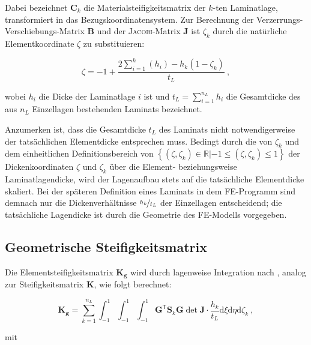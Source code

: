 \documentclass[11pt,titlepage,listof=totoc,bibliography=totoc,twoside]{scrreprt}
\begin{document}
Dabei bezeichnet $\mathbf{C}_k$ die Materialsteifigkeitsmatrix der $k$-ten Laminatlage, transformiert in das Bezugskoordinatensystem. Zur Berechnung der Verzerrungs-Verschiebungs-Matrix $\mathbf{B}$ und der \textsc{Jacobi}-Matrix $\mathbf{J}$ ist $\zeta_k$ durch die natürliche Elementkoordinate $\zeta$ zu substituieren:

\begin{equation}
\label{eq:zeta_k}
 \zeta = -1 + \frac{2 \sum_{i=1}^k \left(h_i \right) - h_k \left(1 - \zeta_k \right)}{t_L} \ ,
\end{equation}

wobei $h_i$ die Dicke der Laminatlage $i$ ist und $t_L = \sum_{i=1}^{n_L} h_i$ die Gesamtdicke des aus $n_L$ Einzellagen bestehenden Laminats bezeichnet.\par
Anzumerken ist, dass die Gesamtdicke $t_L$ des Laminats nicht notwendigerweise der tatsächlichen Elementdicke entsprechen muss. Bedingt durch die von $\zeta_k$ und dem einheitlichen Definitionsbereich von $\left\lbrace \left( \zeta, \zeta_k \right) \in \mathbb{R} | -1 \leq \left( \zeta, \zeta_k \right) \leq 1\right\rbrace$ der Dickenkoordinaten $\zeta$ und $\zeta_k$ über die Element- beziehungsweise Laminatlagendicke, wird der Lagenaufbau stets auf die tatsächliche Elementdicke skaliert. Bei der späteren Definition eines Laminats in dem FE-Programm sind demnach nur die Dickenverhältnisse $\nicefrac{h_k}{t_L}$ der Einzellagen entscheidend; die tatsächliche Lagendicke ist durch die Geometrie des FE-Modells vorgegeben.

\subsection{Geometrische Steifigkeitsmatrix}

Die Elementsteifigkeitsmatrix $\mathbf{K_g}$ wird durch lagenweise Integration nach \cite{Panda1981}, analog zur Steifigkeitsmatrix $\mathbf{K}$, wie folgt berechnet:

\begin{equation}
\label{eq:layerwise_Kg}
 \mathbf{K_g} = \sum_{k=1}^{n_L} \int_{-1}^1 \int_{-1}^1 \int_{-1}^1 \mathbf{G}^\mathsf{T} \mathbf{S}_k \mathbf{G} \det \mathbf{J}  \cdot \frac{h_k}{t_L} \mathrm{d}\xi \mathrm{d}\eta \mathrm{d}\zeta_k \ ,
\end{equation}

mit
\end{document}
